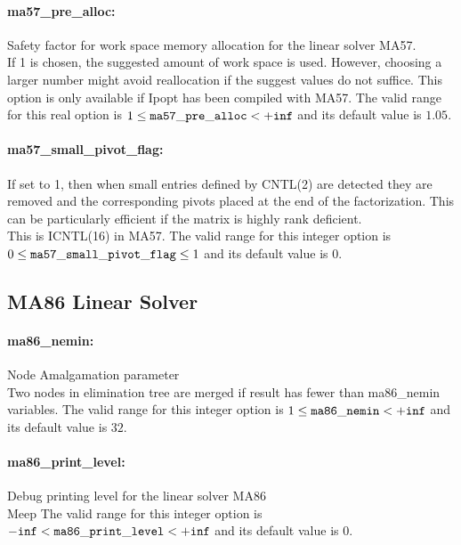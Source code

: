 \paragraph{ma57\_pre\_alloc:}\label{sec:ma57_pre_alloc} Safety factor for work space memory allocation for the linear solver MA57. $\;$ \\
 If 1 is chosen, the suggested amount of work
space is used.  However, choosing a larger number
might avoid reallocation if the suggest values do
not suffice.  This option is only available if
Ipopt has been compiled with MA57. The valid range for this real option is 
$1 \le {\tt ma57\_pre\_alloc } <  {\tt +inf}$
and its default value is $1.05$.


\paragraph{ma57\_small\_pivot\_flag:}\label{sec:ma57_small_pivot_flag} If set to 1, then when small entries defined by CNTL(2) are detected they are removed and the corresponding pivots placed at the end of the factorization.  This can be particularly efficient if the matrix is highly rank deficient. $\;$ \\
 This is ICNTL(16) in MA57. The valid range for this integer option is
$0 \le {\tt ma57\_small\_pivot\_flag } \le 1$
and its default value is $0$.


\subsection{MA86 Linear Solver}
\label{sec:MA86_Linear_Solver}
\paragraph{ma86\_nemin:}\label{sec:ma86_nemin} Node Amalgamation parameter $\;$ \\
 Two nodes in elimination tree are merged if
result has fewer than ma86\_nemin variables. The valid range for this integer option is
$1 \le {\tt ma86\_nemin } <  {\tt +inf}$
and its default value is $32$.


\paragraph{ma86\_print\_level:}\label{sec:ma86_print_level} Debug printing level for the linear solver MA86 $\;$ \\
 Meep The valid range for this integer option is
${\tt -inf} <  {\tt ma86\_print\_level } <  {\tt +inf}$
and its default value is $0$.


